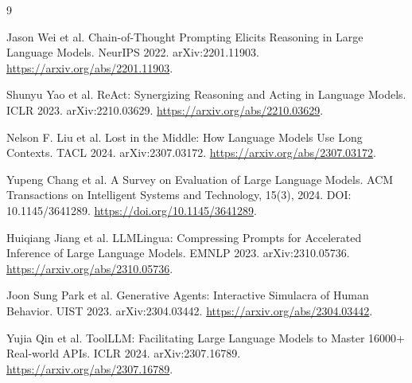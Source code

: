 \documentclass[11pt]{article}
\begin{document}
\begin{thebibliography}{9}

Jason Wei et al.
\newblock Chain-of-Thought Prompting Elicits Reasoning in Large Language Models.
\newblock NeurIPS 2022. arXiv:2201.11903.
\newblock \url{https://arxiv.org/abs/2201.11903}.

Shunyu Yao et al.
\newblock ReAct: Synergizing Reasoning and Acting in Language Models.
\newblock ICLR 2023. arXiv:2210.03629.
\newblock \url{https://arxiv.org/abs/2210.03629}.

Nelson F. Liu et al.
\newblock Lost in the Middle: How Language Models Use Long Contexts.
\newblock TACL 2024. arXiv:2307.03172.
\newblock \url{https://arxiv.org/abs/2307.03172}.

Yupeng Chang et al.
\newblock A Survey on Evaluation of Large Language Models.
\newblock ACM Transactions on Intelligent Systems and Technology, 15(3), 2024.
\newblock DOI: 10.1145/3641289.
\newblock \url{https://doi.org/10.1145/3641289}.

Huiqiang Jiang et al.
\newblock LLMLingua: Compressing Prompts for Accelerated Inference of Large Language Models.
\newblock EMNLP 2023. arXiv:2310.05736.
\newblock \url{https://arxiv.org/abs/2310.05736}.

Joon Sung Park et al.
\newblock Generative Agents: Interactive Simulacra of Human Behavior.
\newblock UIST 2023. arXiv:2304.03442.
\newblock \url{https://arxiv.org/abs/2304.03442}.

Yujia Qin et al.
\newblock ToolLLM: Facilitating Large Language Models to Master 16000+ Real-world APIs.
\newblock ICLR 2024. arXiv:2307.16789.
\newblock \url{https://arxiv.org/abs/2307.16789}.

\end{thebibliography}
\end{document}
